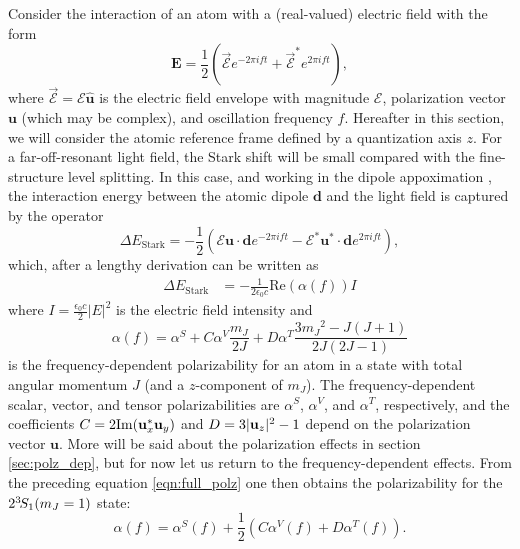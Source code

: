 	Consider the interaction of an atom with a (real-valued) electric field with the form
	\begin{equation}
		\mathbf{E} = \frac{1}{2}\left(\vec{\mathcal{E}}e^{-2\pi i f t}+\vec{\mathcal{E}}^*e^{2\pi i f t}\right),
	\end{equation}
	where $\vec{\mathcal{E}}=\mathcal{E}\hat{\mathbf{u}}$ is the electric field envelope with magnitude $\mathcal{E}$, polarization vector $\mathbf{u}$ (which may be complex), and oscillation frequency $f$.
	Hereafter in this section, we will consider the atomic reference frame defined by a quantization axis $z$. For a far-off-resonant light field, the Stark shift will be small compared with the fine-structure level splitting. 
	In this case, and working in the dipole appoximation \cite{LeKien13}, the interaction energy between the atomic dipole $\mathbf{d}$ and the light field is captured by the operator
	\begin{equation}
		\Delta E_\mathrm{Stark} = -\frac{1}{2}\left(\mathcal{E}\mathbf{u}\cdot\mathbf{d}e^{-2\pi i f t} - \mathcal{E}^*\mathbf{u}^*\cdot\mathbf{d}e^{2\pi i f t}\right),
	\end{equation}
	which, after a lengthy derivation \cite{LeKien13} can be written as
	\begin{align}
		\Delta E_\mathrm{Stark} &= -\frac{1}{2\epsilon_0 c} \mathrm{Re}(\alpha(f)) I
	\end{align}
	where $I= \frac{\epsilon_0 c}{2} |E|^2$ is the electric field intensity and
	\begin{equation}
		\alpha(f) = \alpha^S + C\alpha^V \frac{m_J}{2J} + D\alpha^T\frac{3m{_J}^{2}-J(J+1)}{2J(2J-1)}
		\label{eqn:full_polz}
	\end{equation}
	is the frequency-dependent polarizability for an atom in a state with total angular momentum $J$ (and a $z$-component of $m_J$).  
	The frequency-dependent scalar, vector, and tensor polarizabilities are $\alpha^S$, $\alpha^V$, and $\alpha^T$, respectively, and the coefficients $C=2\mathrm{Im}(\mathbf{u}_{x}^{*}\mathbf{u}_{y})$ and $D= 3|\mathbf{u}_z|^2-1$ depend on the polarization vector $\mathbf{u}$. More will be said about the polarization effects in section \ref{sec:polz_dep}, but for now let us return to the frequency-dependent effects.
	From the preceding equation \ref{eqn:full_polz} one then obtains the polarizability for the $2^{3\!} S_1(m_J=1)$ state:
	\begin{equation}
		 \alpha(f) = \alpha^S(f) + \frac{1}{2}\left(C\alpha^V(f)  + D\alpha^T(f)\right).
		 \label{eqn:master_polz}
	\end{equation}
